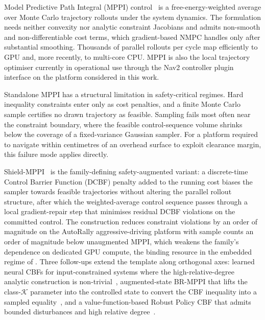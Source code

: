 \documentclass[11pt,a4paper]{article}
\begin{document}
Model Predictive Path Integral (MPPI) control~\parencite{williams2017infomppi,williams2018infomppi} is a free-energy-weighted average over Monte Carlo trajectory rollouts under the system dynamics. The formulation needs neither convexity nor analytic constraint Jacobians and admits non-smooth and non-differentiable cost terms, which gradient-based NMPC handles only after substantial smoothing. Thousands of parallel rollouts per cycle map efficiently to GPU and, more recently, to multi-core CPU. MPPI is also the local trajectory optimiser currently in operational use through the Nav2 controller plugin interface on the platform considered in this work.

Standalone MPPI has a structural limitation in safety-critical regimes. Hard inequality constraints enter only as cost penalties, and a finite Monte Carlo sample certifies no drawn trajectory as feasible. Sampling fails most often near the constraint boundary, where the feasible control-sequence volume shrinks below the coverage of a fixed-variance Gaussian sampler. For a platform required to navigate within centimetres of an overhead surface to exploit clearance margin, this failure mode applies directly.

Shield-MPPI~\parencite{yin2023shieldmppi} is the family-defining safety-augmented variant: a discrete-time Control Barrier Function (DCBF) penalty added to the running cost biases the sampler towards feasible trajectories without altering the parallel rollout structure, after which the weighted-average control sequence passes through a local gradient-repair step that minimises residual DCBF violations on the committed control. The construction reduces constraint violations by an order of magnitude on the AutoRally aggressive-driving platform with sample counts an order of magnitude below unaugmented MPPI, which weakens the family's dependence on dedicated GPU compute, the binding resource in the embedded regime of . Three follow-ups extend the template along orthogonal axes: learned neural CBFs for input-constrained systems where the high-relative-degree analytic construction is non-trivial~\parencite{so2025nsmppi}, augmented-state BR-MPPI that lifts the class-$\mathcal{K}$ parameter into the controlled state to convert the CBF inequality into a sampled equality~\parencite{parwana2025brmppi}, and a value-function-based Robust Policy CBF that admits bounded disturbances and high relative degree~\parencite{knoedler2025rpcbf}.
\end{document}

